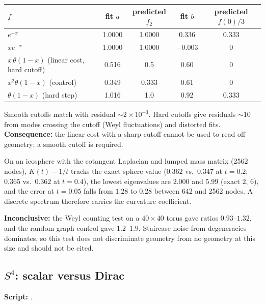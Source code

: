 \documentclass[11pt]{article}
\newcommand{\repo}{https://github.com/juhameskanen/abstract/blob/main/tests}
\newcommand{\testfile}[1]{\href{\repo/#1}{\texttt{\detokenize{#1}}}}
\begin{document}
\begin{center}
\small
\begin{tabular}{@{}lcccc@{}}
\toprule
$f$ & fit $a$ & predicted $f_2$ & fit $b$ & predicted $f(0)/3$\\
\midrule
$e^{-x}$ & 1.0000 & 1.0000 & 0.336 & 0.333\\
$xe^{-x}$ & 1.0000 & 1.0000 & $-0.003$ & 0\\
$x\,\theta(1-x)$ (linear cost, hard cutoff) & 0.516 & 0.5 & 0.60 & 0\\
$x^2\theta(1-x)$ (control) & 0.349 & 0.333 & 0.61 & 0\\
$\theta(1-x)$ (hard step) & 1.016 & 1.0 & 0.92 & 0.333\\
\bottomrule
\end{tabular}
\end{center}

Smooth cutoffs match with residual $\sim\!2\times10^{-3}$. Hard cutoffs give residuals $\sim10$
from modes crossing the cutoff (Weyl fluctuations) and distorted fits.
\textbf{Consequence:} the linear cost with a sharp cutoff cannot be used to read off geometry; a smooth
cutoff is required.

On an icosphere with the cotangent Laplacian and lumped mass matrix (2562 nodes), $K(t)-1/t$ tracks
the exact sphere value ($0.362$ vs.\ $0.347$ at $t=0.2$; $0.365$ vs.\ $0.362$ at $t=0.4$), the
lowest eigenvalues are $2.000$ and $5.99$ (exact $2$, $6$), and the error at $t=0.05$ falls from
$1.28$ to $0.28$ between 642 and 2562 nodes. A discrete spectrum therefore carries the curvature
coefficient.

\textbf{Inconclusive:} the Weyl counting test on a $40\times40$ torus gave ratios $0.93$--$1.32$, and the random-graph
control gave $1.2$--$1.9$. Staircase noise from degeneracies dominates, so this test does not
discriminate geometry from no geometry at this size and should not be cited.


\subsection{\texorpdfstring{$S^4$}{S4}: scalar versus Dirac}
\label{sec:s4}
\textbf{Script:} \testfile{s4_cost_scan.py}.
\end{document}
